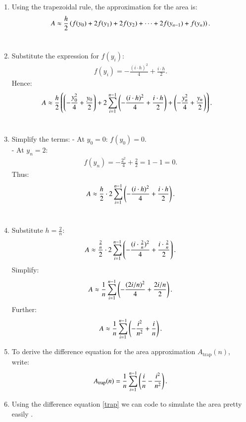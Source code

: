 \documentclass[journal]{IEEEtran}
\begin{document}
\begin{enumerate}
    \item Using the trapezoidal rule, the approximation for the area is:
    \begin{align}
    A \approx \frac{h}{2} \left(f(y_0) + 2f(y_1) + 2f(y_2) + \dots + 2f(y_{n-1}) + f(y_n)\right).
    \end{align} \\

    \item Substitute the expression for $f(y_i)$:
    \begin{align}
    f(y_i) = -\frac{(i \cdot h)^2}{4} + \frac{i \cdot h}{2}.
    \end{align}
    Hence:
    \begin{align}
    A &\approx \frac{h}{2} \left(\left(-\frac{y_0^2}{4} + \frac{y_0}{2}\right) 
    + 2 \sum_{i=1}^{n-1} \left(-\frac{(i \cdot h)^2}{4} + \frac{i \cdot h}{2}\right) 
    + \left(-\frac{y_n^2}{4} + \frac{y_n}{2}\right)\right).
    \end{align} \\

    \item Simplify the terms:
    - At $y_0 = 0$: $f(y_0) = 0$. \\
    - At $y_n = 2$: 
    \begin{align}
    f(y_n) = -\frac{2^2}{4} + \frac{2}{2} = 1 - 1 = 0.
    \end{align}
    Thus:
    \begin{align}
    A \approx \frac{h}{2} \cdot 2 \sum_{i=1}^{n-1} \left(-\frac{(i \cdot h)^2}{4} + \frac{i \cdot h}{2}\right).
    \end{align} \\

    \item Substitute $h = \frac{2}{n}$:
    \begin{align}
    A \approx \frac{\frac{2}{n}}{2} \cdot 2 \sum_{i=1}^{n-1} \left(-\frac{(i \cdot \frac{2}{n})^2}{4} + \frac{i \cdot \frac{2}{n}}{2}\right).
    \end{align}
    Simplify:
    \begin{align}
    A \approx \frac{1}{n} \sum_{i=1}^{n-1} \left(-\frac{(2i/n)^2}{4} + \frac{2i/n}{2}\right).
    \end{align}
    Further:
    \begin{align}
    A \approx \frac{1}{n} \sum_{i=1}^{n-1} \left(-\frac{i^2}{n^2} + \frac{i}{n}\right).
    \end{align}

    \item To derive the difference equation for the area approximation $A_{\text{trap}}(n)$, write:
    \begin{align}
	    A_{\text{trap}}(n) = \frac{1}{n} \sum_{i=1}^{n-1} \left(\frac{i}{n} - \frac{i^2}{n^2}\right).\label{trap}
    \end{align}
 \item Using the difference equation \eqref{trap} we can code to simulate the area pretty easily .


\end{enumerate}
\end{document}
